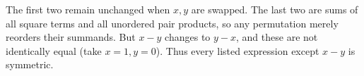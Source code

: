The first two remain unchanged when $x,y$ are swapped. The last two are sums of all square terms and all unordered pair products, so any permutation merely reorders their summands. But $x-y$ changes to $y-x$, and these are not identically equal (take $x=1,y=0$). Thus every listed expression except $\boxed{x-y}$ is symmetric.
